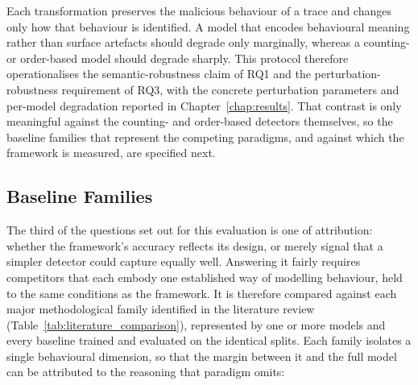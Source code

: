 \documentclass[%
    BCOR=10mm,
    DIV=13,
    toc=bibliography,
    toc=listof,
    oneside,
    12pt,
]{scrbook}
\begin{document}
Each transformation preserves the malicious behaviour of a trace and changes
only how that behaviour is identified. A model that encodes behavioural meaning
rather than surface artefacts should degrade only marginally, whereas a
counting- or order-based model should degrade sharply. This protocol therefore
operationalises the semantic-robustness claim of RQ1 and the
perturbation-robustness requirement of RQ3, with the concrete perturbation
parameters and per-model degradation reported in Chapter~\ref{chap:results}.
That contrast is only meaningful against the counting- and order-based detectors
themselves, so the baseline families that represent the competing paradigms, and
against which the framework is measured, are specified next.

\subsection{Baseline Families}
\label{subsec:baselines}

The third of the questions set out for this evaluation is one of attribution:
whether the framework's accuracy reflects its design, or merely signal that a
simpler detector could capture equally well. Answering it fairly requires
competitors that each embody one established way of modelling behaviour, held to
the same conditions as the framework. It is therefore compared against each
major methodological family identified in the literature review
(Table~\ref{tab:literature_comparison}), represented by one or more models and
every baseline trained and evaluated on the identical splits. Each family
isolates a single behavioural dimension, so that the margin between it and the
full model can be attributed to the reasoning that paradigm omits:
\end{document}
